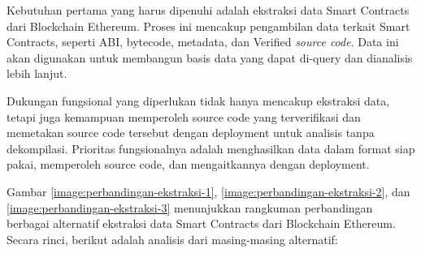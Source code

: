 Kebutuhan pertama yang harus dipenuhi adalah ekstraksi data Smart Contracts dari Blockchain Ethereum. Proses ini mencakup pengambilan data terkait Smart Contracts, seperti ABI, bytecode, metadata, dan Verified \textit{source code}. Data ini akan digunakan untuk membangun basis data yang dapat di-query dan dianalisis lebih lanjut.

Dukungan fungsional yang diperlukan tidak hanya mencakup ekstraksi data, tetapi juga kemampuan memperoleh source code yang terverifikasi dan memetakan source code tersebut dengan deployment untuk analisis tanpa dekompilasi. Prioritas fungsionalnya adalah menghasilkan data dalam format siap pakai, memperoleh source code, dan mengaitkannya dengan deployment.

Gambar \ref{image:perbandingan-ekstraksi-1}, \ref{image:perbandingan-ekstraksi-2}, dan \ref{image:perbandingan-ekstraksi-3} menunjukkan rangkuman perbandingan berbagai alternatif ekstraksi data Smart Contracts dari Blockchain Ethereum. Secara rinci, berikut adalah analisis dari masing-masing alternatif:

